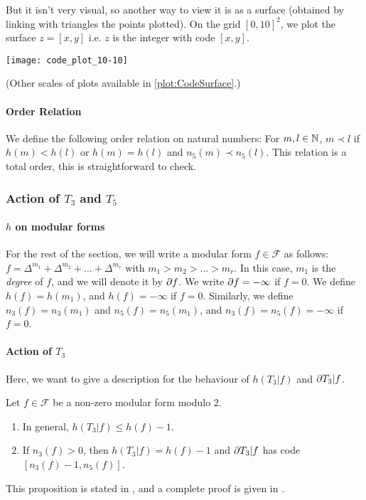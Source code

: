 But it isn't very visual, so another way to view it is as a surface (obtained by linking with triangles the points plotted).
On the grid $\left[ 0,10 \right]^2$, we plot the surface $z = \left[ x, y \right]$ i.e. $z$ is the integer with code $\left[ x, y \right]$.
\begin{center}
	\texttt{[image: code\_plot\_10-10]}
	
	(Other scales of plots available in \ref{plot:CodeSurface}.)
\end{center}


\paragraph{Order Relation}
We define the following order relation on natural numbers:
For $m, l \in \mathbb{N}$, $m \prec l$ if $h(m) < h(l)$ or $h(m) = h(l)$ and $n_5(m) \prec n_5(l)$.
This relation is a total order, this is straightforward to check.

\subsubsection{Action of $T_3$ and $T_5$}
\paragraph{$h$ on modular forms}
For the rest of the section, we will write a modular form $f \in \mathcal{F}$ as follows:
$f = \Delta^{m_1} + \Delta^{m_2} + \dots + \Delta^{m_r}$ with $m_1 > m_2 > \dots > m_r$.
In this case, $m_1$ is the \textit{degree} of $f$, and we will denote it by $\partial f$.
We write $\partial f = -\infty$ if $f=0$.
We define $h(f) = h(m_1)$, and $h(f) = -\infty$ if $f=0$.
Similarly, we define $n_3(f) = n_3(m_1)$ and $n_5(f) = n_5(m_1)$, and $n_3(f) = n_5(f) = -\infty$ if $f=0$.

\paragraph{Action of $T_3$}
Here, we want to give a description for the behaviour of $h(T_3|f)$ and $\partial T_3|f$.
\begin{proposition}
	Let $f \in \mathcal{F}$ be a non-zero modular form modulo 2.
	\begin{enumerate}
		\item In general, $h(T_3|f) \leq h(f)-1$.
		\item If $n_3(f)>0$, then $h(T_3|f) = h(f)-1$ and $\partial T_3|f$ has code $\left[ n_3(f)-1, n_5(f) \right] $.
	\end{enumerate}
\end{proposition}
This proposition is stated in \cite[§4]{OrdreNilpotenceOperateurHecke}, and a complete proof is given in \cite{ModularFormsMcGill}.

